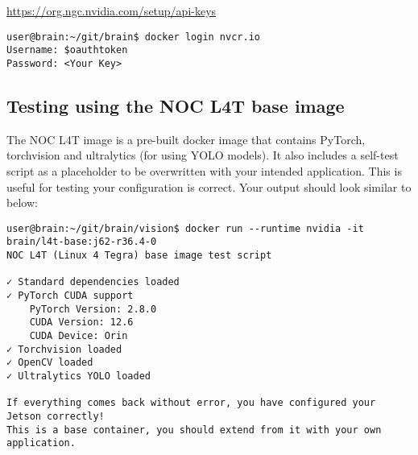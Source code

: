 \documentclass{article}
\begin{document}
\href{https://org.ngc.nvidia.com/setup/api-keys}{https://org.ngc.nvidia.com/setup/api-keys}

\begin{lstlisting}
user@brain:~/git/brain$ docker login nvcr.io
Username: $oauthtoken
Password: <Your Key>
\end{lstlisting}

\subsection{Testing using the NOC L4T base image}

The NOC L4T image is a pre-built docker image that contains PyTorch, torchvision and ultralytics (for using YOLO models). It also includes a self-test script as a placeholder to be overwritten with your intended application. This is useful for testing your configuration is correct. Your output should look similar to below:

\begin{lstlisting}
user@brain:~/git/brain/vision$ docker run --runtime nvidia -it brain/l4t-base:j62-r36.4-0
NOC L4T (Linux 4 Tegra) base image test script

✓ Standard dependencies loaded
✓ PyTorch CUDA support
    PyTorch Version: 2.8.0
    CUDA Version: 12.6
    CUDA Device: Orin
✓ Torchvision loaded
✓ OpenCV loaded
✓ Ultralytics YOLO loaded

If everything comes back without error, you have configured your Jetson correctly!
This is a base container, you should extend from it with your own application.
\end{lstlisting}
\end{document}
